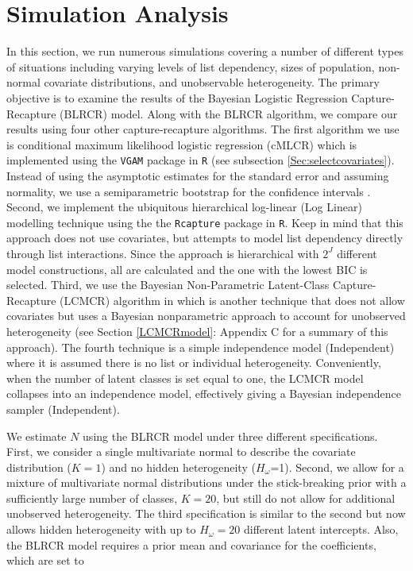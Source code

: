 \documentclass[
  12pt,
]{article}
\begin{document}
\newpage
\section{Simulation Analysis}
\label{sec:simulationanalysis}

In this section, we run numerous simulations covering a number of
different types of situations including varying levels of list
dependency, sizes of population, non-normal covariate distributions, and
unobservable heterogeneity. The primary objective is to examine the
results of the Bayesian Logistic Regression Capture-Recapture (BLRCR)
model. Along with the BLRCR algorithm, we compare our results using four
other capture-recapture algorithms. The first algorithm we use is
conditional maximum likelihood logistic regression (cMLCR) which is
implemented using the \texttt{VGAM} package in \texttt{R} (see
subsection \ref{Sec:selectcovariates}). Instead of using the asymptotic
estimates for the standard error and assuming normality, we use a
semiparametric bootstrap for the confidence intervals
\citep{zwane_implementing_2003}. Second, we implement the ubiquitous
hierarchical log-linear (Log Linear) modelling technique
\citep{fienberg_multiple_1972} using the the \texttt{Rcapture} package
in \texttt{R}. Keep in mind that this approach does not use covariates,
but attempts to model list dependency directly through list
interactions. Since the approach is hierarchical with \(2^J\) different
model constructions, all are calculated and the one with the lowest BIC
is selected. Third, we use the Bayesian Non-Parametric Latent-Class
Capture-Recapture (LCMCR) algorithm in
\cite{manriquevallier_bayesian_2016} which is another technique that
does not allow covariates but uses a Bayesian nonparametric approach to
account for unobserved heterogeneity (see Section \ref{LCMCRmodel}:
Appendix C for a summary of this approach). The fourth technique is a
simple independence model (Independent) where it is assumed there is no
list or individual heterogeneity. Conveniently, when the number of
latent classes is set equal to one, the LCMCR model collapses into an
independence model, effectively giving a Bayesian independence sampler
(Independent).

We estimate \(N\) using the BLRCR model under three different
specifications. First, we consider a single multivariate normal to
describe the covariate distribution (\(K=1\)) and no hidden
heterogeneity (\(H_\omega\)=1). Second, we allow for a mixture of
multivariate normal distributions under the stick-breaking prior with a
sufficiently large number of classes, \(K=20\), but still do not allow
for additional unobserved heterogeneity. The third specification is
similar to the second but now allows hidden heterogeneity with up to
\(H_\omega=20\) different latent intercepts. Also, the BLRCR model
requires a prior mean and covariance for the coefficients, which are set
to
\end{document}
